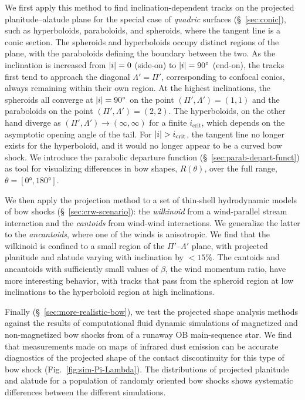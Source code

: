 We first apply this method to find inclination-dependent tracks on the
projected planitude--alatude plane for the special case of
\textit{quadric} surfaces (\S~\ref{sec:conic}), such as hyperboloids,
paraboloids, and spheroids, where the tangent line is a conic section.
The spheroids and hyperboloids occupy distinct regions of the plane,
with the paraboloids defining the boundary between the two.  As the
inclination is increased from \(\lvert i\rvert = 0\) (side-on) to
\(\lvert i\rvert = \ang{90}\) (end-on), the tracks first tend to approach the
diagonal \(\Lambda' = \Pi'\), corresponding to confocal conics, always
remaining within their own region.  At the highest inclinations, the
spheroids all converge at \(\lvert i\rvert = \ang{90}\) on the point
\((\Pi', \Lambda') = (1, 1)\) and the paraboloids on the point
\((\Pi', \Lambda') = (2, 2)\).  The hyperboloids, on the other hand diverge as
\((\Pi', \Lambda') \to (\infty, \infty)\) for a finite
\(i_{\mathrm{crit}}\), which depends on the asymptotic opening angle
of the tail.  For \(\lvert i\rvert > i_{\mathrm{crit}}\), the tangent line no
longer exists for the hyperboloid, and it would no longer appear to be
a curved bow shock.  We introduce the parabolic departure function
(\S~\ref{sec:parab-depart-funct}) as tool for visualizing differences
in bow shapes, \(R(\theta)\), over the full range,
\(\theta = [\ang{0}, \ang{180}]\).

We then apply the projection method to a set of thin-shell
hydrodynamic models of bow shocks (\S~\ref{sec:crw-scenario}): the
\textit{wilkinoid} from a wind-parallel stream interaction and the
\textit{cantoids} from wind-wind interactions.  We generalize the
latter to the \textit{ancantoids}, where one of the winds is
anisotropic.  We find that the wilkinoid is confined to a small region
of the \(\Pi'\)--\(\Lambda'\) plane, with projected planitude and alatude
varying with inclination by \(< 15\%\).  The cantoids and ancantoids
with sufficiently small values of \(\beta\), the wind momentum ratio, have
more interesting behavior, with tracks that pass from the spheroid
region at low inclinations to the hyperboloid region at high
inclinations.

Finally (\S~\ref{sec:more-realistic-bow}), we test the projected shape
analysis methods against the results of computational fluid dynamic
simulations of magnetized and non-magnetized bow shocks from
\citet{Meyer:2017a} of a runaway OB main-sequence star.  We find that
measurements made on maps of infrared dust emission can be accurate
diagnostics of the projected shape of the contact discontinuity for
this type of bow shock (Fig.~\ref{fig:sim-Pi-Lambda}).  The
distributions of projected planitude and alatude for a population of
randomly oriented bow shocks shows systematic differences between the
different simulations.

